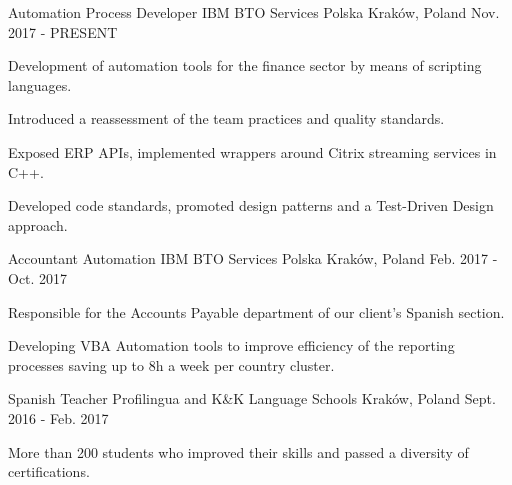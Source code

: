 

\begin{cventries}

  \cventry
    {Automation Process Developer} %
    {IBM BTO Services Polska} %
    {Kraków, Poland} %
    {Nov. 2017 - PRESENT} %
    {
      \begin{cvitems} %
        \item {Development of automation tools for the finance sector by means of scripting languages.}
        \item {Introduced a reassessment of the team practices and quality standards.}
		\item {Exposed ERP APIs, implemented wrappers around Citrix streaming services in C++.}
        \item {Developed code standards, promoted design patterns and a Test-Driven Design approach.}
      \end{cvitems}
    }

  \cventry
    {Accountant Automation} %
    {IBM BTO Services Polska} %
	{Kraków, Poland} %
	{Feb. 2017 - Oct. 2017} %
    {
      \begin{cvitems} %
        \item {Responsible for the Accounts Payable department of our client's Spanish section.}
        \item {Developing VBA Automation tools to improve efficiency of the reporting processes saving up to 8h a week per country cluster.}
      \end{cvitems}
    }

  \cventry
    {Spanish Teacher} %
    {Profilingua and K\&K Language Schools} %
	{Kraków, Poland} %
	{Sept. 2016 - Feb. 2017} %
    {
      \begin{cvitems} %
        \item {More than 200 students who improved their skills and passed a diversity of certifications.}
      \end{cvitems}
    }

\end{cventries}

